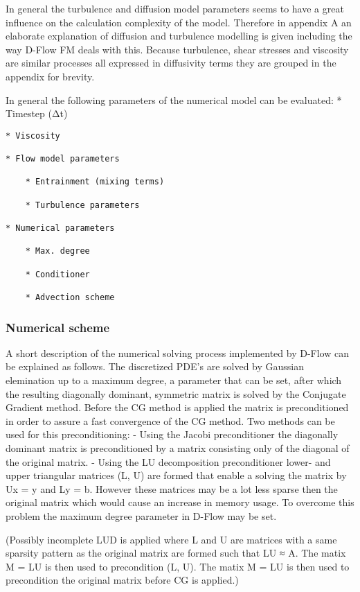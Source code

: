 In general the turbulence and diffusion model parameters seems to have a
great influence on the calculation complexity of the model. Therefore in
appendix A an elaborate explanation of diffusion and turbulence
modelling is given including the way D-Flow FM deals with this. Because
turbulence, shear stresses and viscosity are similar processes all
expressed in diffusivity terms they are grouped in the appendix for
brevity.

In general the following parameters of the numerical model can be
evaluated: * Timestep (Δt)

\begin{verbatim}
* Viscosity

* Flow model parameters

    * Entrainment (mixing terms)

    * Turbulence parameters

* Numerical parameters 

    * Max. degree

    * Conditioner

    * Advection scheme
\end{verbatim}

\subsubsection{Numerical scheme}\label{numerical-scheme}

A short description of the numerical solving process implemented by
D-Flow can be explained as follows. The discretized PDE's are solved by
Gaussian elemination up to a maximum degree, a parameter that can be
set, after which the resulting diagonally dominant, symmetric matrix is
solved by the Conjugate Gradient method. Before the CG method is applied
the matrix is preconditioned in order to assure a fast convergence of
the CG method. Two methods can be used for this preconditioning: - Using
the Jacobi preconditioner the diagonally dominant matrix is
preconditioned by a matrix consisting only of the diagonal of the
original matrix. - Using the LU decomposition preconditioner lower- and
upper triangular matrices (L, U) are formed that enable a solving the
matrix by Ux = y and Ly = b. However these matrices may be a lot less
sparse then the original matrix which would cause an increase in memory
usage. To overcome this problem the maximum degree parameter in D-Flow
may be set.

\citep[ p.21]{DFlowTechMan}

(Possibly incomplete LUD is applied where L and U are matrices with a
same sparsity pattern as the original matrix are formed such that LU ≈
A. The matix M = LU is then used to precondition (L, U). The matix M =
LU is then used to precondition the original matrix before CG is
applied.)
